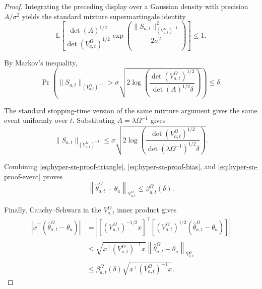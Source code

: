 \documentclass{article} %
\begin{document}
\begin{proof}
Integrating the preceding display over a Gaussian density with precision \(A/\sigma^2\) yields the standard mixture supermartingale identity
\begin{equation}
\label{eq:hyper-sn-proof-mixture}
\mathbb{E}
\left[
\frac{\det(A)^{1/2}}{\det(V_{a,t}^{\Omega})^{1/2}}
\exp\!\left(
\frac{
\|S_{a,t}\|_{\left(V_{a,t}^{\Omega}\right)^{-1}}^2
}{2\sigma^2}
\right)
\right]
\le
1 .
\end{equation}

By Markov's inequality,
\begin{equation}
\label{eq:hyper-sn-proof-markov}
\Pr\!\left(
\|S_{a,t}\|_{\left(V_{a,t}^{\Omega}\right)^{-1}}
>
\sigma
\sqrt{
2\log
\left(
\frac{
\det(V_{a,t}^{\Omega})^{1/2}
}{
\det(A)^{1/2}\delta
}
\right)
}
\right)
\le
\delta .
\end{equation}

The standard stopping-time version of the same mixture argument gives the same event uniformly over \(t\).  Substituting \(A=\lambda\Omega^{-1}\) gives
\begin{equation}
\label{eq:hyper-sn-proof-event}
\|S_{a,t}\|_{\left(V_{a,t}^{\Omega}\right)^{-1}}
\le
\sigma
\sqrt{
2\log
\left(
\frac{
\det(V_{a,t}^{\Omega})^{1/2}
}{
\det(\lambda\Omega^{-1})^{1/2}\delta
}
\right)
}.
\end{equation}

Combining \eqref{eq:hyper-sn-proof-triangle}, \eqref{eq:hyper-sn-proof-bias}, and \eqref{eq:hyper-sn-proof-event} proves
\begin{equation}
\label{eq:hyper-sn-proof-param}
\left\|
\widehat{\theta}_{a,t}^{\Omega}-\theta_a
\right\|_{V_{a,t}^{\Omega}}
\le
\beta_{a,t}^{\Omega}(\delta).
\end{equation}

Finally, Cauchy--Schwarz in the \(V_{a,t}^{\Omega}\) inner product gives
\begin{align}
\label{eq:hyper-sn-proof-pred}
\left|
x^\top
\left(
\widehat{\theta}_{a,t}^{\Omega}-\theta_a
\right)
\right|
&=
\left|
\left[
\left(V_{a,t}^{\Omega}\right)^{-1/2}x
\right]^\top
\left[
\left(V_{a,t}^{\Omega}\right)^{1/2}
\left(
\widehat{\theta}_{a,t}^{\Omega}-\theta_a
\right)
\right]
\right|
\\
&\le
\sqrt{x^\top\left(V_{a,t}^{\Omega}\right)^{-1}x}
\left\|
\widehat{\theta}_{a,t}^{\Omega}-\theta_a
\right\|_{V_{a,t}^{\Omega}}
\\
&\le
\beta_{a,t}^{\Omega}(\delta)
\sqrt{x^\top\left(V_{a,t}^{\Omega}\right)^{-1}x}.
\end{align}
\end{proof}
\end{document}
